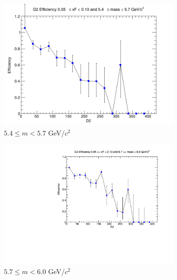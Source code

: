 \begin{figure}[p]
\begin{subfigure}[b]{0.32\textwidth}
        \includegraphics[width=\textwidth]{./kTrackerEfficiencyPlots/D2_Efficiency_xF1_mass4.png}
        \caption{$5.4 \leq m < 5.7$ GeV/$c^2$}
        \label{fig:xF1_mass4}
    \end{subfigure}
    \hfill
    \begin{subfigure}[b]{0.32\textwidth}
        \centering
        \includegraphics[width=\textwidth]{./kTrackerEfficiencyPlots/D2_Efficiency_xF1_mass5.pdf}
        \caption{$5.7 \leq m < 6.0$ GeV/$c^2$}
        \label{fig:xF1_mass5}
    \end{subfigure}
    \vspace{0.5cm}
    \begin{subfigure}[b]{0.32\textwidth}
        \centering

\end{subfigure}
\end{figure}
